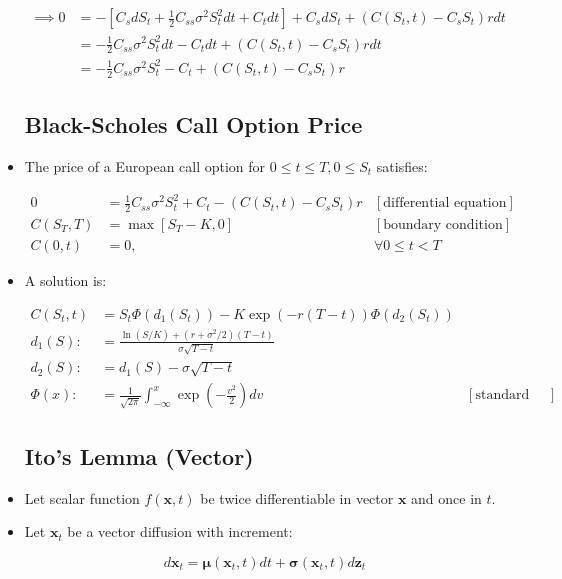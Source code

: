 \documentclass{article}
\newcommand{\xbf}{\mathbf{x}}
\newcommand{\zbf}{\mathbf{z}}
\newcommand{\mubf}{\boldsymbol{\mu}}
\newcommand{\sigmabf}{\boldsymbol{\sigma}}
\begin{document}
\begin{itemize}
\begin{align*}
\implies 0 
&= -[ C_s dS_t + \frac{1}{2} C_{ss} \sigma^2 S_t^2 dt + C_t dt] + C_s dS_t + (C(S_t, t) - C_s S_t)rdt\\
&= - \frac{1}{2} C_{ss} \sigma^2 S_t^2 dt - C_t dt + (C(S_t, t) - C_s S_t)rdt\\
&= - \frac{1}{2} C_{ss} \sigma^2 S_t^2 - C_t + (C(S_t, t) - C_s S_t)r
\end{align*}

\subsection*{Black-Scholes Call Option Price}

\item The price of a European call option for $0 \le t \le T, 0 \le S_t$ satisfies:

\begin{align*}
0 &= \frac{1}{2} C_{ss} \sigma^2 S_t^2 + C_t - (C(S_t, t) - C_s S_t)r & [\text{differential equation}]\\
C(S_T, T) &= \max[S_T - K, 0] & [\text{boundary condition}]\\
C(0, t) &= 0, & \forall 0 \le t < T
\end{align*}

\item A solution is:

\begin{align*}
C(S_t, t) &= S_t \Phi(d_1(S_t)) - K \exp(-r(T-t)) \Phi(d_2(S_t)) \\
d_1(S) :&= \frac{\ln(S/K) + (r+\sigma^2/2)(T-t)}{\sigma\sqrt{T - t}} \\
d_2(S) :&= d_1(S) - \sigma \sqrt{T - t}\\
\Phi(x) :&= \frac{1}{\sqrt{2\pi}} \int_{-\infty}^x \exp (- \frac{v^2}{2}) dv & [\text{standard normal cdf}]
\end{align*}

\subsection*{Ito's Lemma (Vector)}

\item Let scalar function $f(\xbf, t)$ be twice differentiable in vector $\xbf$ and once in $t$.

\item Let $\xbf_t$ be a vector diffusion with increment:

$$
d \xbf_t = \mubf(\xbf_t, t) dt + \sigmabf(\xbf_t, t) d \zbf_t
$$


\end{itemize}
\end{document}

